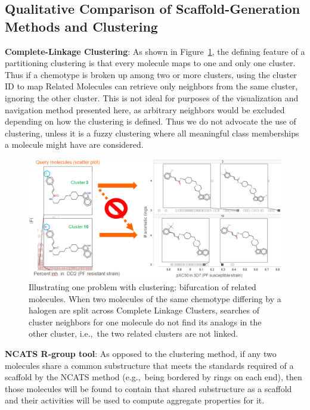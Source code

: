 \documentclass[journal=jacsat,manuscript=article]{achemso}
\newcommand*\fref[1]{Figure~\ref{fig:#1}}
\newcommand*\eg{e.g.,~}
\newcommand*\ie{i.e.,~}
\begin{document}
\subsection{Qualitative Comparison of Scaffold-Generation Methods and Clustering}
{\bf Complete-Linkage Clustering}: As shown in \fref{clusterlanes}, the defining feature of a partitioning clustering is that every molecule maps to one and only one cluster. Thus if a chemotype is broken up among two or more clusters, using the cluster ID to map Related Molecules can retrieve only neighbors from the same cluster, ignoring the other cluster. This is not ideal for purposes of the visualization and navigation method presented here, as arbitrary neighbors would be excluded depending on how the clustering is defined.  Thus we do not advocate the use of clustering, unless it is a fuzzy clustering where all meaningful class memberships a molecule might have are considered. 

\begin{figure}
\includegraphics[width=6in]{fig/clusterlanes.png}
\caption{Illustrating one problem with clustering: bifurcation of related molecules.  When two molecules of the same chemotype differing by a halogen are split across Complete Linkage Clusters, searches of cluster neighbors for one molecule do not find its analogs in the other cluster, \ie the two related clusters are not linked.}
\label{fig:clusterlanes}
\end{figure}



{\bf NCATS R-group tool}: As opposed to the clustering method, 
if any two molecules share a common substructure that meets the standards required of a scaffold by the NCATS method (\eg being bordered by rings on each end), then those molecules will be found to contain that shared substructure as a scaffold and their activities will be used to compute aggregate properties for it. 
\end{document}
